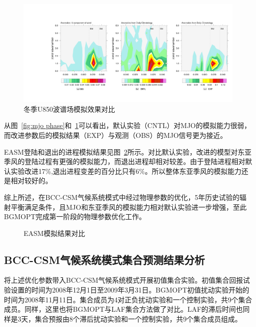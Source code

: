 \begin{figure}[H] %
  \centering
  \includegraphics[scale=0.45,trim=155 50 20 110,clip]{figures/u850-winter3.pdf}
  \caption{冬季U850波谱场模拟效果对比}
  \label{fig:mjo u850}
\end{figure}
从图~\ref{fig:mjo phase}和~\ref{fig:mjo u850}可以看出，默认实验（CNTL）对MJO的模拟能力很弱，而改进参数后的模拟结果（EXP）与观测（OBS）的MJO信号更为接近。

EASM登陆和退出的进程模拟结果见图~\ref{Fig:easmresut}所示。对比默认实验，改进的模型对东亚季风的登陆过程有更强的模拟能力，而退出进程却相对较差。由于登陆进程相对默认实验改进17\%,退出进程变差的百分比只有6\%。所以整体东亚季风的模拟能力还是相对较好的。

综上所述，在BCC-CSM气候系统模式中经过物理参数的优化，5年历史试验的辐射平衡满足条件，且MJO和东亚季风的模拟能力相对默认实验进一步增强，至此BGMOPT完成第一阶段的物理参数优化工作。

\begin{figure}[H] %
 \centering

\caption{EASM模拟结果对比}
\label{Fig:easmresut}
\end{figure}


\subsection{BCC-CSM气候系统模式集合预测结果分析}
将上述优化参数带入BCC-CSM气候系统模式开展初值集合实验。初值集合回报试验设置的时间为2008年12月1日至2009年3月31日。BGMOPT初值扰动实验开始的时间为2008年11月11日。集合成员为4对正负扰动实验和一个控制实验，共9个集合成员。同样，这里也将BGMOPT与LAF集合方法做了对比。LAF的滞后时间也同样是3天，集合预报由8个滞后扰动实验和一个控制实验，共9个集合成员组成。

